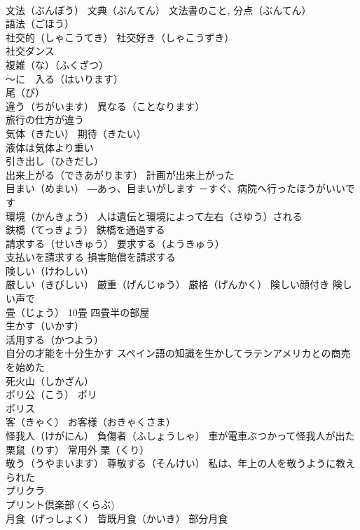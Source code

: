 \documentclass[8pt]{extreport}
\begin{document}
\begin{CJK}{UTF8}{min}
\\	文法（ぶんぽう） 文典（ぶんてん） 文法書のこと, 分点（ぶんてん）
\\	語法（ごほう） 
\\	社交的（しゃこうてき） 社交好き（しゃこうずき）
\\	社交ダンス
\\	複雑（な）（ふくざつ）
\\	～に　入る（はいります）
\\	尾（び）
\\	違う（ちがいます） 異なる（ことなります）
\\	旅行の仕方が違う
\\	気体（きたい） 期待（きたい）
\\	液体は気体より重い
\\	引き出し（ひきだし）
\\	出来上がる（できあがります） 計画が出来上がった
\\	目まい（めまい） ―あっ、目まいがします －すぐ、病院へ行ったほうがいいです
\\	環境（かんきょう） 人は遺伝と環境によって左右（さゆう）される
\\	鉄橋（てっきょう） 鉄橋を通過する
\\	請求する（せいきゅう） 要求する（ようきゅう）
\\	支払いを請求する 損害賠償を請求する
\\	険しい（けわしい） 
\\	厳しい（きびしい） 厳重（げんじゅう） 厳格（げんかく） 険しい顔付き 険しい声で
\\	畳（じょう） 10畳 四畳半の部屋
\\	生かす（いかす）
\\	活用する（かつよう）
\\	自分の才能を十分生かす スペイン語の知識を生かしてラテンアメリカとの商売を始めた
\\	死火山（しかざん）
\\	ポリ公（こう） ポリ 
\\	ポリス
\\	客（きゃく） お客様（おきゃくさま）
\\	怪我人（けがにん） 負傷者（ふしょうしゃ） 車が電車ぶつかって怪我人が出た
\\	栗鼠（りす） 常用外 栗（くり）
\\	敬う（うやまいます） 尊敬する（そんけい） 私は、年上の人を敬うように教えられた
\\	プリクラ 
\\	プリント倶楽部 (くらぶ)
\\	月食（げっしょく） 皆既月食（かいき） 部分月食

\end{CJK}
\end{document}
